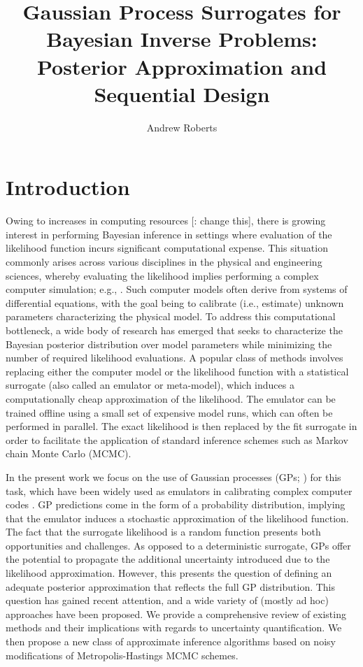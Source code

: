 \documentclass[12pt]{article}
\title{Gaussian Process Surrogates for Bayesian Inverse Problems: Posterior Approximation and Sequential Design}
\author{Andrew Roberts}
\begin{document}
\maketitle

\section{Introduction}
Owing to increases in computing resources [\todo: change this], there is growing interest in performing Bayesian inference 
in settings where evaluation of the likelihood function incurs significant computational expense. This situation commonly 
arises across various disciplines in the physical and engineering sciences, whereby evaluating the likelihood 
implies performing a complex computer simulation; e.g., \citep{ESM_modeling_2pt0}. Such computer models often derive from 
systems of differential equations, with the goal being to calibrate (i.e., estimate) unknown parameters characterizing the physical model.
To address this computational bottleneck, a wide body of research has emerged that seeks to characterize the Bayesian 
posterior distribution over model parameters while minimizing the number of required likelihood evaluations. 
A popular class of methods involves replacing either the computer model or the likelihood function with a statistical 
surrogate (also called an emulator or meta-model), which induces a computationally cheap approximation of the likelihood.
The emulator can be trained offline \citep{modularization} using a small set of expensive model runs, which can often be 
performed in parallel. The exact likelihood is then replaced by the fit surrogate in order to facilitate the application of 
standard inference schemes such as Markov chain Monte Carlo (MCMC). 

In the present work we focus on the use of Gaussian processes (GPs; \citet{gpML}) for this task, which have been widely used as 
emulators in calibrating complex computer codes 
\citep{design_analysis_computer_experiments,SanterCompExp,gramacy2020surrogates}. 
GP predictions come in the form of a probability distribution, implying that 
the emulator induces a stochastic approximation of the likelihood function. The fact that the surrogate likelihood is a random 
function presents both opportunities and challenges. As opposed to a deterministic surrogate, GPs offer the potential to 
propagate the additional uncertainty introduced due to the likelihood approximation. However, this presents the question
of defining an adequate posterior approximation that reflects the full GP distribution. This question has gained recent 
attention, and a wide variety of (mostly ad hoc) approaches have been proposed. We provide a comprehensive review of 
existing methods and their implications with regards to uncertainty quantification. We then propose a new class of 
approximate inference algorithms based on noisy modifications of Metropolis-Hastings MCMC schemes.
\end{document}
